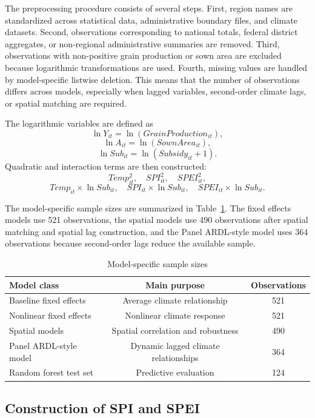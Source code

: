 \documentclass[12pt,a4paper]{article}
\begin{document}
The preprocessing procedure consists of several steps. First, region names are standardized across statistical data, administrative boundary files, and climate datasets. Second, observations corresponding to national totals, federal district aggregates, or non-regional administrative summaries are removed. Third, observations with non-positive grain production or sown area are excluded because logarithmic transformations are used. Fourth, missing values are handled by model-specific listwise deletion. This means that the number of observations differs across models, especially when lagged variables, second-order climate lags, or spatial matching are required.

The logarithmic variables are defined as
\[
\ln Y_{it}=\ln(GrainProduction_{it}),
\]
\[
\ln A_{it}=\ln(SownArea_{it}),
\]
\[
\ln Sub_{it}=\ln(Subsidy_{it}+1).
\]
Quadratic and interaction terms are then constructed:
\[
Temp^2_{it},\quad SPI^2_{it},\quad SPEI^2_{it},
\]
\[
Temp_{it}\times \ln Sub_{it},\quad SPI_{it}\times \ln Sub_{it},\quad SPEI_{it}\times \ln Sub_{it}.
\]

The model-specific sample sizes are summarized in Table~\ref{tab:samples}. The fixed effects models use 521 observations, the spatial models use 490 observations after spatial matching and spatial lag construction, and the Panel ARDL-style model uses 364 observations because second-order lags reduce the available sample.

\begin{table}[H]
\centering
\caption{Model-specific sample sizes}
\label{tab:samples}
\begin{tabular}{lcc}
\toprule
Model class & Main purpose & Observations \\
\midrule
Baseline fixed effects & Average climate relationship & 521 \\
Nonlinear fixed effects & Nonlinear climate response & 521 \\
Spatial models & Spatial correlation and robustness & 490 \\
Panel ARDL-style model & Dynamic lagged climate relationships & 364 \\
Random forest test set & Predictive evaluation & 124 \\
\bottomrule
\end{tabular}
\end{table}

\subsection{Construction of SPI and SPEI}
\end{document}
